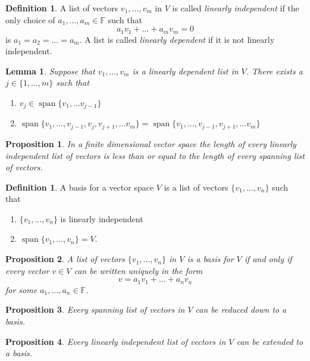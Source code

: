 \documentclass[12pt,letterpaper]{article}
\renewcommand{\span}{\operatorname {span}}
\theoremstyle{plain}
\newtheorem{proposition}{Proposition}[section]
\newtheorem{lemma}[theorem]{Lemma}
\theoremstyle{definition}
\newtheorem{definition}[theorem]{Definition}
\numberwithin{equation}{section}
\begin{document}
\begin{definition} A list of vectors $v_1,\ldots, v_m$ in $V$ is called \emph{linearly independent} if the only choice of $a_1, \ldots, a_m\in \mathbb{F}$ such that 
\[a_1v_1+\ldots+a_mv_m=0\] is $a_1=a_2=\ldots =a_m$. A list is called \emph{linearly dependent} if it is not linearly independent.
\end{definition}

\begin{lemma} Suppose that $v_1,\ldots, v_m$ is a linearly dependent list in $V$. There exists a $j\in\{1,\ldots, m\}$ such that \\
\begin{enumerate}[1)]
\item $v_j\in \span\{v_1,\ldots v_{j-1}\}$
\item $\span\{v_1,\ldots, v_{j-1},v_j,v_{j+1},\ldots v_m\}=\span\{v_1,\ldots, v_{j-1},v_{j+1},\ldots v_m\}$
\end{enumerate}
\end{lemma}

\begin{proposition} In a finite dimensional vector space the length of every linearly independent list of vectors is less than or equal to the length of every spanning list of vectors. 
\end{proposition}


\begin{definition} A basis for a vector space $V$ is a list of vectors $\{v_1, \ldots, v_n\}$ such that 
\begin{enumerate}[1.]
\item $\{v_1, \ldots, v_n\}$ is linearly independent
\item $\span\{v_1, \ldots, v_n\}=V$. 
\end{enumerate}
\end{definition}
\begin{proposition} A list of vectors $\{v_1, \ldots, v_n\}$ in $V$ is a basis for $V$ if and only if every vector $v\in V$ can be written \emph{uniquely} in the form
\[v=a_1v_1+\ldots+a_nv_n\]
for some $a_1, \ldots, a_n\in \mathbb{F}$. 
\end{proposition}
\begin{proposition} Every spanning list of vectors in $V$ can be reduced down to a basis. 
\end{proposition}

\begin{proposition} Every linearly independent list of vectors in $V$ can be extended to a basis.  
\end{proposition}
\end{document}
